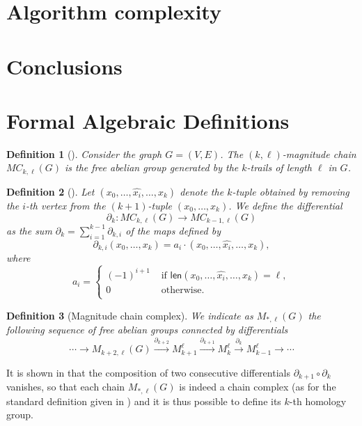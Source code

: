\documentclass{article}
\newtheorem{definition}{Definition}
\newcommand{\len}{\textsf{len}}
\newcommand{\giuliaM}[1]{\todo[color=blue!40]{#1}}
\begin{document}
\section{Algorithm complexity}

\section{Conclusions}

\appendix
\section{Formal Algebraic Definitions}\label{app:algebra}

\begin{definition}[\cite{hepworth2015categorifying}]\label{def:magchain}
	Consider the graph $G=(V,E)$.
	The $(k,\ell)$-magnitude chain $MC_{k,\ell}(G)$ is the free abelian group generated by the $k$-trails of length $\ell$ in $G$.
\end{definition}

\begin{definition}[\cite{hepworth2015categorifying}]
	\label{differential}
	Let $(x_0,\dots,\hat{x_i},\dots,x_k)$ denote the $k$-tuple obtained by removing the $i$-th vertex from the $(k+1)$-tuple $(x_0,\dots,x_k)$.  We define the differential 
	\[
	\partial_k: MC_{k,\ell}(G) \to MC_{k-1,\ell}(G)
	\]
	as the sum $\partial_k= \sum_{i=1}^{k-1} \partial_{k,i}$ of the maps defined by 
	\[
	\partial_{k,i}(x_0,\dots,x_k) = a_i\cdot(x_0,\dots,\hat{x_i},\dots,x_k),
	\]
	where
	\[a_i=\begin{cases}
		(-1)^{i+1} &\text{ if } \len(x_0,\dots,\hat{x_i},\dots,x_k) = \ell, \\
		0 &\text{ otherwise.}\\
	\end{cases}
	\]
\end{definition}

\begin{definition}[Magnitude chain complex]\label{def:magchaincomplex}
	We indicate as $M_{*,\ell}(G)$ the following sequence of free abelian groups connected by differentials
	\[
	\cdots \to M_{k+2,\ell}(G) \xrightarrow{\partial_{k+2}} M_{k+1}^{\ell} \xrightarrow{\partial_{k+1}} M_{k}^{\ell} \xrightarrow{\partial_{k}} M_{k-1}^{\ell} \to \cdots
	\]
\end{definition}

It is shown in \cite[Lemma 11]{hepworth2015categorifying} that the composition of two consecutive differentials $\partial_{k+1} \circ \partial_k$ vanishes, so that each chain $M_{*,\ell}(G)$ is indeed a chain complex (as for the standard definition given in \cite{hatcher2005algebraic}) and it is thus possible to define its $k$-th homology group.
\end{document}
